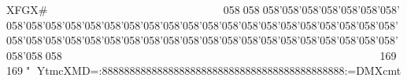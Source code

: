 XFG     X   #                                  058058058'058'058'058'058'058'058'058'058'058'058'058'058'058'058'058'058'058'058'058'058'058'058'058'058'058'058'058'058'058'058'058'058'058'058'058'058'058'058'058'058'058'058'058'058'058'058'058'058058                                  169169"%
Y   t   m   c   X   M   D   =   :   8   8   8   8   8   8   8   8   8   8   8   8   8   8   8   8   8   8   8   8   8   8   8   8   8   8   8   8   8   8   8   8   8   8   8   8   8   8   8   8   8   8   8   8   :   =   D   M   X   c   m   t	
